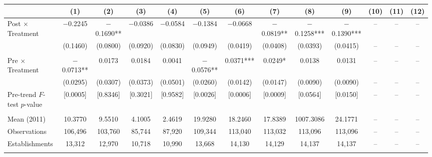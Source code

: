 \documentclass[12pt,letterpaper]{article}
\begin{document}
\begin{table}[]
\begin{threeparttable}
\begin{tabular}{lcccccccccccc}
 & (1) & (2) & (3) & (4) & (5) & (6) & (7) & (8) & (9) & (10) & (11) & (12) \\
\midrule
Post $\times$ Treatment & $-$0.2245 & $-$0.1690** & $-$0.0386 & $-$0.0584 & $-$0.1384 & $-$0.0668 & $-$0.0819** & $-$0.1258*** & $-$0.1390*** & -- & -- & -- \\
  & (0.1460) & (0.0800) & (0.0920) & (0.0830) & (0.0949) & (0.0419) & (0.0408) & (0.0393) & (0.0415) & -- & -- & -- \\
  &  &  &  &  &  &  &  &  &  &  &  & \\
Pre $\times$ Treatment & $-$0.0713** & 0.0173 & 0.0184 & 0.0041 & $-$0.0576** & 0.0371*** & 0.0249* & 0.0138 & 0.0131 & -- & -- & -- \\
  & (0.0295) & (0.0307) & (0.0373) & (0.0501) & (0.0260) & (0.0142) & (0.0147) & (0.0090) & (0.0090) & -- & -- & -- \\
Pre-trend $F$-test $p$-value & [0.0005] & [0.8346] & [0.3021] & [0.9582] & [0.0026] & [0.0006] & [0.0009] & [0.0564] & [0.0150] & -- & -- & -- \\
  &  &  &  &  &  &  &  &  &  &  &  & \\
Mean (2011) & 10.3770 & 9.5510 & 4.1005 & 2.4619 & 19.9280 & 18.2460 & 17.8389 & 1007.3086 & 24.1771 & -- & -- & -- \\
Observations & 106{,}496 & 103{,}760 & 85{,}744 & 87{,}920 & 109{,}344 & 113{,}040 & 113{,}032 & 113{,}096 & 113{,}096 & -- & -- & -- \\
Establishments & 13{,}312 & 12{,}970 & 10{,}718 & 10{,}990 & 13{,}668 & 14{,}130 & 14{,}129 & 14{,}137 & 14{,}137 & -- & -- & -- \\
  &  &  &  &  &  &  &  &  &  &  &  & \\
\midrule

\end{tabular}
\end{threeparttable}
\end{table}
\end{document}
